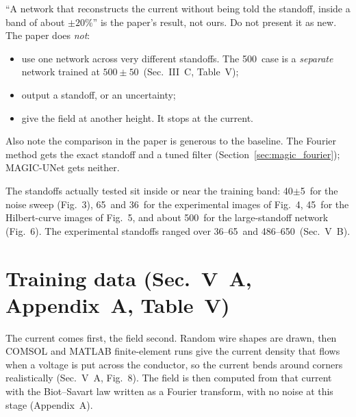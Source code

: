 \begin{careful}
``A network that reconstructs the current without being told the standoff, inside a band of about $\pm20\%$'' is the
paper's result, not ours. Do not present it as new. The paper does \emph{not}:
\begin{itemize}
\item use one network across very different standoffs. The 500\um\ case is a \emph{separate} network trained at
$500\pm50$\um\ (Sec.~III~C, Table~V);
\item output a standoff, or an uncertainty;
\item give the field at another height. It stops at the current.
\end{itemize}
Also note the comparison in the paper is generous to the baseline. The Fourier method gets the exact standoff and a
tuned filter (Section~\ref{sec:magic_fourier}); MAGIC-UNet gets neither.
\end{careful}

The standoffs actually tested sit inside or near the training band: 40$\pm$5\um\ for the noise sweep (Fig.~3), 65\um\ and
36\um\ for the experimental images of Fig.~4, 45\um\ for the Hilbert-curve images of Fig.~5, and about 500\um\ for the
large-standoff network (Fig.~6). The experimental standoffs ranged over 36--65\um\ and 486--650\um\ (Sec.~V~B).

\section{Training data (Sec.~V~A, Appendix~A, Table~V)}

The current comes first, the field second. Random wire shapes are drawn, then COMSOL and MATLAB finite-element runs give
the current density that flows when a voltage is put across the conductor, so the current bends around corners
realistically (Sec.~V~A, Fig.~8). The field is then computed from that current with the Biot--Savart law written as a
Fourier transform, with no noise at this stage (Appendix~A).

